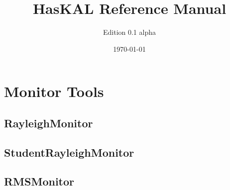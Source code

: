 \documentclass[10pt, a4paper, onecolumn, oneside]{article}
\title{HasKAL Reference Manual}
\author{Edition 0.1 alpha}
\date{\today}
\begin{document}
\maketitle
\tableofcontents %
\newpage

\section{Monitor Tools}

\subsection{RayleighMonitor}

\newpage

\subsection{StudentRayleighMonitor}

\newpage

\subsection{RMSMonitor}

\newpage
\end{document}
